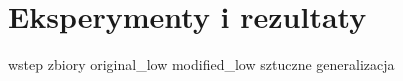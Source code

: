 \chapter{Eksperymenty i rezultaty}

{wstep}
{zbiory}
{original_low}
{modified_low}
{sztuczne}
{generalizacja}

